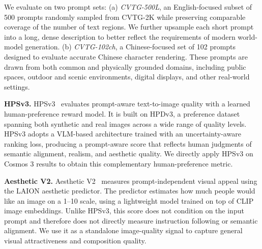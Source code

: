 \documentclass{llmxive}
\begin{document}
We evaluate on two prompt sets:
(a) \textit{CVTG-500L}, an English-focused subset of 500 prompts randomly sampled from CVTG-2K while preserving comparable coverage of the number of text regions. We further upsample each short prompt into a long, dense description to better reflect the requirements of modern world-model generation.
(b) \textit{CVTG-102ch}, a Chinese-focused set of 102 prompts designed to evaluate accurate Chinese character rendering. These prompts are drawn from both common and physically grounded domains, including public spaces, outdoor and scenic environments, digital displays, and other real-world settings.

\textbf{HPSv3.} HPSv3~\citep{ma2025hpsv3} evaluates prompt-aware text-to-image quality with a learned human-preference reward model. It is built on HPDv3, a preference dataset spanning both synthetic and real images across a wide range of quality levels. HPSv3 adopts a VLM-based architecture trained with an uncertainty-aware ranking loss, producing a prompt-aware score that reflects human judgments of semantic alignment, realism, and aesthetic quality. We directly apply HPSv3 on Cosmos 3 results to obtain this complementary human-preference metric.

\textbf{Aesthetic V2.} Aesthetic V2~\citep{laionaesthetics} measures prompt-independent visual appeal using the LAION aesthetic predictor. The predictor estimates how much people would like an image on a 1--10 scale, using a lightweight model trained on top of CLIP image embeddings. Unlike HPSv3, this score does not condition on the input prompt and therefore does not directly measure instruction following or semantic alignment. We use it as a standalone image-quality signal to capture general visual attractiveness and composition quality.
\end{document}
